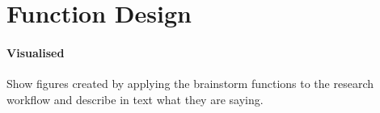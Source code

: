 \section{Function Design}

\paragraph{Visualised}
Show figures created by applying the brainstorm functions to the research workflow and describe in text what they are saying.